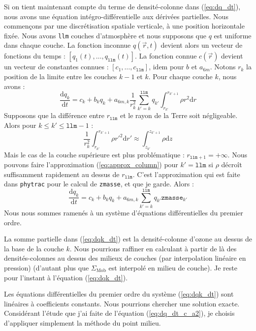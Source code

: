 \documentclass[a4paper,english,french]{article}
\newcommand{\ud}{\mathrm{d}}
\begin{document}
Si on tient maintenant compte du terme de densité-colonne dans
(\ref{eq:dq_dt}), nous avons une équation intégro-différentielle aux
dérivées partielles. Nous commençons par une discrétisation spatiale
verticale, à une position horizontale fixée. Nous avons \verb+llm+
couches d'atmosphère et nous supposons que $q$ est uniforme dans
chaque couche. La fonction inconnue $q(\vec r, t)$ devient alors un
vecteur de fonctions du temps : $[q_1(t), \dots, q_\mathtt{llm}(t)]$.
La fonction connue $c(\vec r)$ devient un vecteur de constantes
connues : $[c_1, \dots, c_\mathtt{llm}]$, idem pour $b$ et $a_{6m}$.
Notons $r_k$ la position de la limite entre les couches $k-1$
et $k$. Pour chaque couche $k$, nous avons :
\begin{displaymath}
  \frac{\ud q_k}{\ud t}
  = c_k + b_k q_k
  + a_{6m,k} \frac{1}{r_k^2}
  \sum_{k'=k} ^{\mathtt{llm}} q_{k'} \int_{r_{k'}} ^{r_{k'+1}} \rho r^2 \ud r
\end{displaymath}
Supposons que la différence entre $r_\mathtt{llm}$  et
le rayon de la Terre soit négligeable. Alors pour $k \le k' \le \mathtt{llm}
- 1$ :
\begin{equation}
  \label{eq:approx_column}
  \frac{1}{r_k^2} \int_{r_{k'}} ^{r_{k'+1}}\rho r'^2 \ud r'
  \approx \int_{z_{k'}} ^{z_{k'+1}} \rho \ud z
\end{equation}
Mais le cas de la couche supérieure est plus problématique :
$r_{\mathtt{llm}+1} = + \infty$. Nous pouvons faire l'approximation
(\ref{eq:approx_column}) pour $k' = \mathtt{llm}$ si $\rho$ décroît
suffisamment rapidement au dessus de $r_\mathtt{llm}$. C'est
l'approximation qui est faite dans \verb+phytrac+ pour le calcul de
\verb+zmasse+, et que je garde. Alors :
\begin{equation}
  \label{eq:dqk_dt}
  \frac{\ud q_k}{\ud t}
  = c_k + b_k q_k
  + a_{6m,k} \sum_{k'=k} ^{\mathtt{llm}} q_{k'} \mathtt{zmasse}_{k'}
\end{equation}
Nous nous sommes ramenés à un système d'équations différentielles du
premier ordre.

La somme partielle dans (\ref{eq:dqk_dt}) est la densité-colonne
d'ozone au dessus de la base de la couche $k$. Nous pourrions raffiner
en calculant à partir de là des densités-colonnes au dessus des
milieux de couches (par interpolation linéaire en pression) (d'autant
plus que $\Sigma_\mathrm{Mob}$ est interpolé en milieu de couche). Je
reste pour l'instant à l'équation (\ref{eq:dqk_dt}).

Les équations différentielles du premier ordre du système
(\ref{eq:dqk_dt}) sont linéaires à coefficients constants. Nous
pourrions chercher une solution exacte. Considérant l'étude que j'ai
faite de l'équation (\ref{eq:dq_dt_c_a2}), je choisis d'appliquer
simplement la méthode du point milieu.
\end{document}
